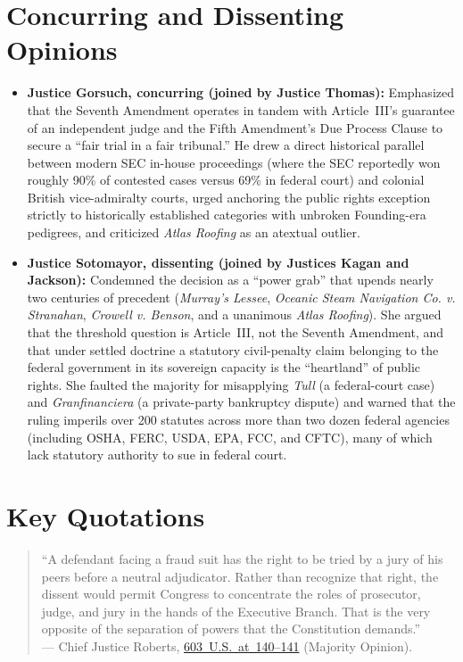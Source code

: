 \documentclass[12pt]{article}
\begin{document}
\section{Concurring and Dissenting Opinions}
\begin{itemize}
  \item \textbf{Justice Gorsuch, concurring (joined by Justice Thomas):} Emphasized that the Seventh Amendment operates in tandem with Article~III's guarantee of an independent judge and the Fifth Amendment's Due Process Clause to secure a ``fair trial in a fair tribunal.'' He drew a direct historical parallel between modern SEC in-house proceedings (where the SEC reportedly won roughly 90\% of contested cases versus 69\% in federal court) and colonial British vice-admiralty courts, urged anchoring the public rights exception strictly to historically established categories with unbroken Founding-era pedigrees, and criticized \textit{Atlas Roofing} as an atextual outlier.
  \item \textbf{Justice Sotomayor, dissenting (joined by Justices Kagan and Jackson):} Condemned the decision as a ``power grab'' that upends nearly two centuries of precedent (\textit{Murray's Lessee}, \textit{Oceanic Steam Navigation Co. v. Stranahan}, \textit{Crowell v. Benson}, and a unanimous \textit{Atlas Roofing}). She argued that the threshold question is Article~III, not the Seventh Amendment, and that under settled doctrine a statutory civil-penalty claim belonging to the federal government in its sovereign capacity is the ``heartland'' of public rights. She faulted the majority for misapplying \textit{Tull} (a federal-court case) and \textit{Granfinanciera} (a private-party bankruptcy dispute) and warned that the ruling imperils over 200 statutes across more than two dozen federal agencies (including OSHA, FERC, USDA, EPA, FCC, and CFTC), many of which lack statutory authority to sue in federal court.
\end{itemize}

\section{Key Quotations}
\begin{quote}
``A defendant facing a fraud suit has the right to be tried by a jury of his peers before a neutral adjudicator. Rather than recognize that right, the dissent would permit Congress to concentrate the roles of prosecutor, judge, and jury in the hands of the Executive Branch. That is the very opposite of the separation of powers that the Constitution demands.'' \\
--- Chief Justice Roberts, \href{https://supreme.justia.com/cases/federal/us/603/22-859/}{603~U.S.~at~140--141} (Majority Opinion).
\end{quote}
\end{document}
